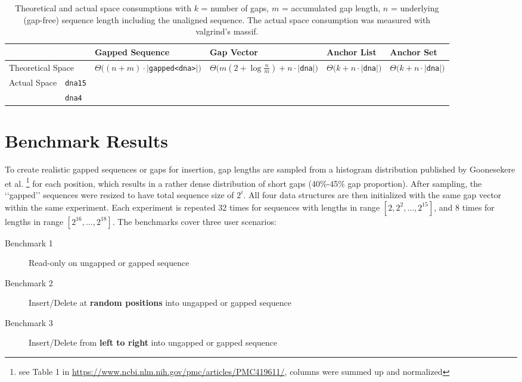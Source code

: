 \documentclass[11pt, letterpaper, twoside]{article}
\begin{document}
\begin{table}[htpb]\centering
{\small
\begin{tabular}{|l|l|l|l|l|l|}
\hline
\multicolumn{2}{|c}{}&\bf Gapped Sequence&\bf Gap Vector&\bf Anchor List&\bf Anchor Set\\
\hline
\multicolumn{2}{|l}{Theoretical Space}&$\Theta \big ( (n+m)\cdot |$\verb|gapped<dna>|$|\big )$&$\Theta \big ( m(2+\log \frac{n}{m}) + n\cdot|$\verb|dna|$|\big ) $&$\Theta (k + n\cdot |$\verb|dna|$|)$&$\Theta (k+ n\cdot |$\verb|dna|$|)$\\
\hline
\multirow{2}{*}{Actual Space}&\verb|dna15|&&&&\\
&\verb|dna4|&&&&\\ 
\hline
\end{tabular}\caption{Theoretical and actual space consumptions with $k$ = number of gaps, $m$ = accumulated gap length, $n$ = underlying (gap-free) sequence length including the unaligned sequence. The actual space consumption was measured with valgrind's massif.}	
}
\end{table}


\section{Benchmark Results}
To create realistic gapped sequences or gaps for insertion, gap lengths are sampled from a histogram distribution published by Goonesekere et al. \footnote{see Table 1 in \url{https://www.ncbi.nlm.nih.gov/pmc/articles/PMC419611/}, columns were summed up and normalized} for each position, which results in a rather dense distribution of short gaps (40\%-45\% gap proportion). After sampling, the \lq\lq gapped\rq\rq{} sequences were resized to have total sequence size of $2^i$. All four data structures are then initialized with the same gap vector within the same experiment. Each experiment is repeated 32 times for sequences with lengths in range $[2, 2^2, ..., 2^{15}]$, and 8 times for lengths in range $[2^{16}, ...,2^{18}]$. The benchmarks cover three user scenarios:
\begin{description}
    \item[Benchmark 1] Read-only on ungapped or gapped sequence
    \item[Benchmark 2] Insert/Delete at {\bf random positions} into ungapped or gapped sequence
    \item[Benchmark 3] Insert/Delete from {\bf left to right} into ungapped or gapped sequence
\end{description}
\end{document}
